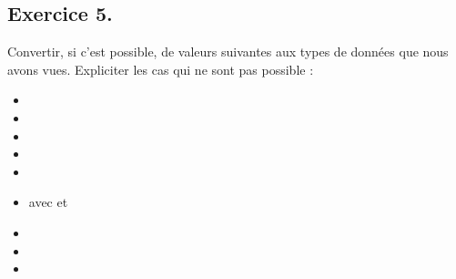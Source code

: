 \documentclass[letterpaper,10pt,french]{sphinxmanual}
\begin{document}
\begin{sphinxVerbatim}[commandchars=\\\{\}]
\end{sphinxVerbatim}




\subsection{Exercice 5.}
\label{\detokenize{exo1:exercice-5}}
\sphinxAtStartPar
Convertir, si c’est possible, de valeurs suivantes aux types de données que nous avons vues. Expliciter les cas qui ne sont pas possible :
\begin{itemize}
\item {} 
\sphinxAtStartPar
{}

\item {} 
\sphinxAtStartPar
{}

\item {} 
\sphinxAtStartPar
{}

\item {} 
\sphinxAtStartPar
{}

\item {} 
\sphinxAtStartPar
{}

\item {} 
\sphinxAtStartPar
{} avec  et 

\item {} 
\sphinxAtStartPar
{}

\item {} 
\sphinxAtStartPar
{}

\item {} 
\sphinxAtStartPar
{}

\end{itemize}

\begin{sphinxVerbatim}[commandchars=\\\{\}]
\end{sphinxVerbatim}
\end{document}

